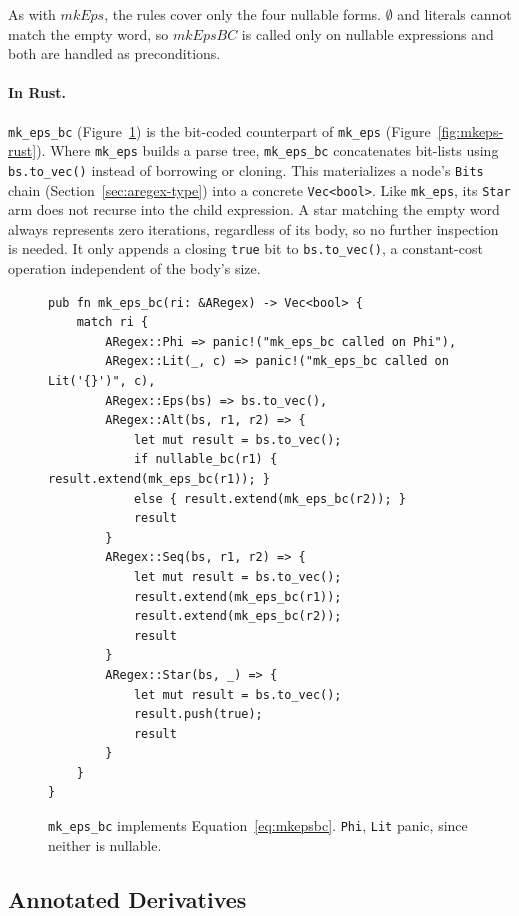 As with $\mathit{mkEps}$, the rules cover only the four nullable forms.
$\emptyset$ and literals cannot match the empty word, 
so $\mathit{mkEpsBC}$ is called only on nullable expressions 
and both are handled as preconditions.

%

\paragraph{In Rust.}
\texttt{mk\_eps\_bc} (Figure~\ref{fig:mkepsbc-rust})
is the bit-coded counterpart of \texttt{mk\_eps} (Figure~\ref{fig:mkeps-rust}).
Where \texttt{mk\_eps} builds a parse tree, 
\texttt{mk\_eps\_bc} concatenates bit-lists 
using \texttt{bs.to\_vec()} instead of borrowing or cloning.
This materializes a node's \texttt{Bits} chain
(Section~\ref{sec:aregex-type}) into a concrete \texttt{Vec<bool>}.
Like \texttt{mk\_eps}, its \texttt{Star} arm does not recurse into
the child expression.
A star matching the empty word always represents zero iterations,
regardless of its body, so no further inspection is needed.
It only appends a closing \texttt{true} bit to \texttt{bs.to\_vec()},
a constant-cost operation independent of the body's size.
\begin{figure}[H]
\small
\begin{verbatim}
pub fn mk_eps_bc(ri: &ARegex) -> Vec<bool> {
    match ri {
        ARegex::Phi => panic!("mk_eps_bc called on Phi"),
        ARegex::Lit(_, c) => panic!("mk_eps_bc called on Lit('{}')", c),
        ARegex::Eps(bs) => bs.to_vec(),
        ARegex::Alt(bs, r1, r2) => {
            let mut result = bs.to_vec();
            if nullable_bc(r1) { result.extend(mk_eps_bc(r1)); } 
            else { result.extend(mk_eps_bc(r2)); }
            result
        }
        ARegex::Seq(bs, r1, r2) => {
            let mut result = bs.to_vec();
            result.extend(mk_eps_bc(r1));
            result.extend(mk_eps_bc(r2));
            result
        }
        ARegex::Star(bs, _) => {
            let mut result = bs.to_vec();
            result.push(true);
            result
        }
    }
}
\end{verbatim}
\caption{\texttt{mk\_eps\_bc} implements Equation~\eqref{eq:mkepsbc}. 
\texttt{Phi}, \texttt{Lit} panic, since neither is nullable.}
\label{fig:mkepsbc-rust}
\end{figure}

%
%
%

\subsection{Annotated Derivatives}
\label{sec:deriv-bc-theory}

